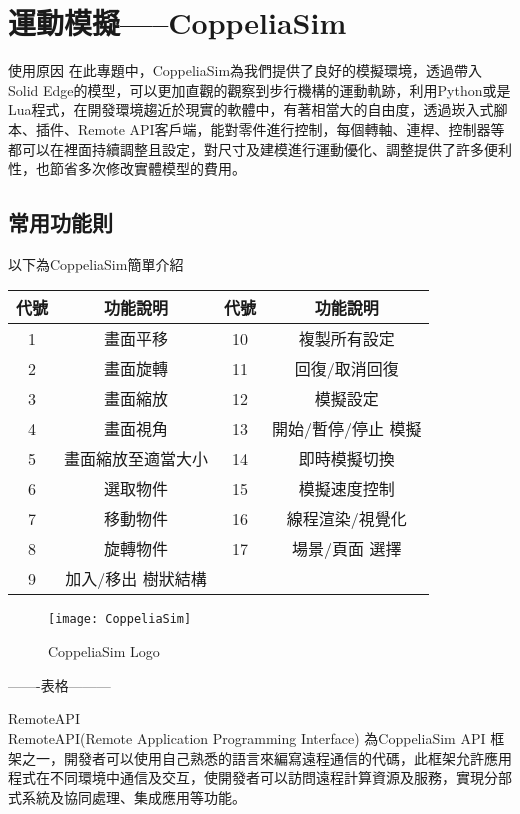 \section{運動模擬-----CoppeliaSim}
\qquad 使用原因
在此專題中，CoppeliaSim為我們提供了良好的模擬環境，透過帶入Solid Edge的模型，可以更加直觀的觀察到步行機構的運動軌跡，利用Python或是Lua程式，在開發環境趨近於現實的軟體中，有著相當大的自由度，透過崁入式腳本、插件、Remote API客戶端，能對零件進行控制，每個轉軸、連桿、控制器等都可以在裡面持續調整且設定，對尺寸及建模進行運動優化、調整提供了許多便利性，也節省多次修改實體模型的費用。\\

\subsection{常用功能則}
以下為CoppeliaSim簡單介紹

\begin{table}[htbp]
  \centering
  \large
  \setlength{\tabcolsep}{0.75cm}
  \begin{tabular}{|c|c|c|c|}
    \hline
    代號 & 功能說明 & 代號 & 功能說明 \\
    \hline
    1 & 畫面平移 & 10 & 複製所有設定 \\
    \hline
    2 & 畫面旋轉 & 11 & 回復/取消回復 \\
    \hline
    3 & 畫面縮放 & 12 & 模擬設定 \\
    \hline
    4 & 畫面視角 & 13 & 開始/暫停/停止 模擬 \\
    \hline
    5 & 畫面縮放至適當大小 & 14 & 即時模擬切換 \\
    \hline
    6 & 選取物件 & 15 & 模擬速度控制 \\
    \hline
    7 & 移動物件 & 16 & 線程渲染/視覺化 \\
    \hline
    8 & 旋轉物件 & 17 & 場景/頁面 選擇 \\
    \hline
    9 & 加入/移出 樹狀結構 & & \\
    \hline
  \end{tabular}
\end{table}
\begin{figure}[hbt!]
\center
\texttt{[image: CoppeliaSim]}
\caption{\Large CoppeliaSim Logo}
\end{figure}
-------表格---------

\qquad RemoteAPI\\

RemoteAPI(Remote Application Programming Interface) 為CoppeliaSim API 框架之一，開發者可以使用自己熟悉的語言來編寫遠程通信的代碼，此框架允許應用程式在不同環境中通信及交互，使開發者可以訪問遠程計算資源及服務，實現分部式系統及協同處理、集成應用等功能。\\

